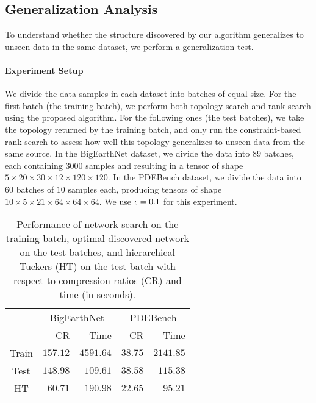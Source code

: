 \subsection{Generalization Analysis}\label{sec:eval:general}
%
To understand whether the structure discovered by our algorithm generalizes to unseen data in the same dataset, we perform a generalization test.
%
\paragraph{Experiment Setup}
We divide the data samples in each dataset into batches of equal size.
%
For the first batch (the training batch), we perform both topology search and rank search using the proposed algorithm.
%
For the following ones (the test batches), we take the topology returned by the training batch, and only run the constraint-based rank search to assess how well this topology generalizes to unseen data from the same source.
%
In the BigEarthNet dataset, we divide the data into $89$ batches, each containing $3000$ samples and resulting in a tensor of shape $5 \times 20 \times 30 \times 12 \times 120 \times 120$.
%
In the PDEBench dataset, we divide the data into $60$ batches of $10$ samples each, producing tensors of shape $10 \times 5 \times 21 \times 64 \times 64 \times 64$.
%
We use $\epsilon = 0.1$ for this experiment.
%

\begin{table}[t]
    \centering
    \small
    \caption{Performance of network search on the training batch, optimal discovered network on the test batches, and hierarchical Tuckers (HT) on the test batch with respect to compression ratios (CR) and time (in seconds).}\label{tab:generalization}
    \begin{tabular}{c|rr|rr}
        \toprule
        & \multicolumn{2}{c|}{BigEarthNet}  & \multicolumn{2}{c}{PDEBench} \\
        \cmidrule{2-5}
        & CR & Time & CR & Time\\
        \midrule
        Train & $157.12$ & $4591.64$  & $38.75$ & $2141.85$ \\
        Test &$148.98$ & $109.61$ & $38.58$ & $115.38$ \\
        HT  & $60.71$ & $190.98$ & $22.65$ & $95.21$ \\
        \bottomrule
    \end{tabular}
    \vspace{-20pt}
\end{table}

